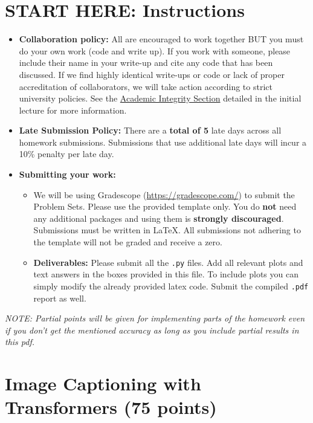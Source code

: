 \documentclass[11pt,addpoints,answers]{exam}
\numberwithin{equation}{section} %
\numberwithin{figure}{section} %
\numberwithin{table}{section} %
\begin{document}
\section*{START HERE: Instructions}
\begin{itemize}
\item \textbf{Collaboration policy:} All are encouraged to work together BUT you must do your own work (code and write up). If you work with someone, please include their name in your write-up and cite any code that has been discussed. If we find highly identical write-ups or code or lack of proper accreditation of collaborators, we will take action according to strict university policies. See the \href{hhttps://www.cmu.edu/policies/student-and-student-life/academic-integrity.html}{Academic Integrity Section} detailed in the initial lecture for more information.

\item\textbf{Late Submission Policy:} There are a \textbf{total of 5} late days across all homework submissions. Submissions that use additional late days will incur a 10\% penalty per late day.

\item\textbf{Submitting your work:}

\begin{itemize}

\item We will be using Gradescope (\url{https://gradescope.com/}) to submit the Problem Sets. Please use the provided template only. You do \textbf{not} need any additional packages and using them is \textbf{strongly discouraged}. Submissions must be written in LaTeX. All submissions not adhering to the template will not be graded and receive a zero. 
\item \textbf{Deliverables:} Please submit all the \texttt{.py} files. Add all relevant plots and text answers in the boxes provided in this file. To include plots you can simply modify the already provided latex code. Submit the compiled \texttt{.pdf} report as well.
\end{itemize}
\end{itemize}
\emph{NOTE: Partial points will be given for implementing parts of the homework even if you don't get the mentioned accuracy as long as you include partial results in this pdf.}
\clearpage

\section{Image Captioning with Transformers (75 points)}
\end{document}
